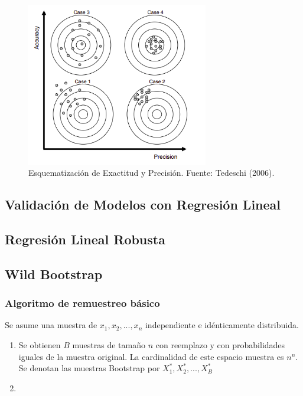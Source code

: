 \begin{figure}[ht]
	\centering
	\includegraphics[width=300px]{img/tadeshi_casos.png}
	\caption{Esquematización de Exactitud y Precisión. Fuente: Tedeschi (2006).}
	\label{fig:etiqueta}
\end{figure}

\subsection{Validación de Modelos con Regresión Lineal}


\subsection{Regresión Lineal Robusta}
\subsection{Wild Bootstrap}

\subsubsection{Algoritmo de remuestreo básico}

Se asume una muestra de $ x_{1}, x_{2}, ...,  x_{n}$ independiente e idénticamente distribuida.

\begin{enumerate}
		\item Se obtienen $B$ muestras de tamaño $n$ con reemplazo y con probabilidades iguales de la muestra original. La cardinalidad de este espacio muestra es $n^{n}$. Se denotan las muestras Bootstrap por $X^{*}_{1}, X^{*}_{2}, ..., X^{*}_{B}$
		
		\item 
\end{enumerate}



